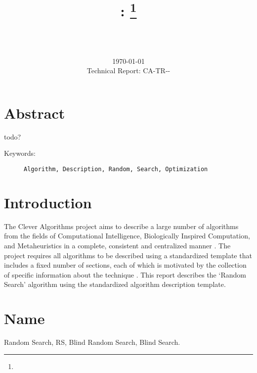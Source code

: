 \documentclass[a4paper, 11pt]{article}
\title{{\myreporttitle}: {\myreportsubtitle}\footnote{\myreportlicense}}
\author{\myreportauthor\\{\myreportemail}\\\small\myreportproject}
\date{\today\\{\small{Technical Report: CA-TR-{\myreportdate}-\myreportversion}}}
\begin{document}
\maketitle

\section*{Abstract} 
todo?

\begin{description}
	\item[Keywords:] {\small\texttt{Algorithm, Description, Random, Search, Optimization}}
\end{description} 

\section{Introduction} 
\label{sec:intro}
The Clever Algorithms project aims to describe a large number of algorithms from the fields of Computational Intelligence, Biologically Inspired Computation, and Metaheuristics in a complete, consistent and centralized manner \cite{Brownlee2010}.
The project requires all algorithms to be described using a standardized template that includes a fixed number of sections, each of which is motivated by the collection of specific information about the technique \cite{Brownlee2010a}.
This report describes the `Random Search' algorithm using the standardized algorithm description template. 

\section{Name} 
\label{sec:name}
Random Search, RS, Blind Random Search, Blind Search.

\end{document}
